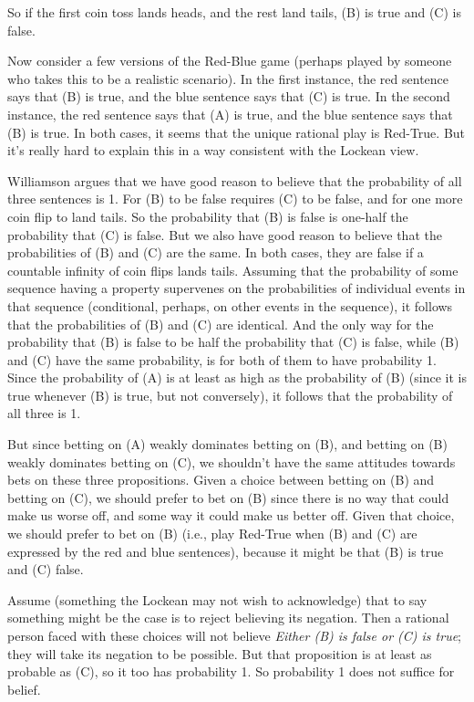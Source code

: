 \documentclass[11pt,]{book}
\begin{document}
So if the first coin toss lands heads, and the rest land tails, (B) is true and (C) is false.

Now consider a few versions of the Red-Blue game (perhaps played by someone who takes this to be a realistic scenario). In the first instance, the red sentence says that (B) is true, and the blue sentence says that (C) is true. In the second instance, the red sentence says that (A) is true, and the blue sentence says that (B) is true. In both cases, it seems that the unique rational play is Red-True. But it's really hard to explain this in a way consistent with the Lockean view.

Williamson argues that we have good reason to believe that the probability of all three sentences is 1. For (B) to be false requires (C) to be false, and for one more coin flip to land tails. So the probability that (B) is false is one-half the probability that (C) is false. But we also have good reason to believe that the probabilities of (B) and (C) are the same. In both cases, they are false if a countable infinity of coin flips lands tails. Assuming that the probability of some sequence having a property supervenes on the probabilities of individual events in that sequence (conditional, perhaps, on other events in the sequence), it follows that the probabilities of (B) and (C) are identical. And the only way for the probability that (B) is false to be half the probability that (C) is false, while (B) and (C) have the same probability, is for both of them to have probability 1. Since the probability of (A) is at least as high as the probability of (B) (since it is true whenever (B) is true, but not conversely), it follows that the probability of all three is 1.

But since betting on (A) weakly dominates betting on (B), and betting on (B) weakly dominates betting on (C), we shouldn't have the same attitudes towards bets on these three propositions. Given a choice between betting on (B) and betting on (C), we should prefer to bet on (B) since there is no way that could make us worse off, and some way it could make us better off. Given that choice, we should prefer to bet on (B) (i.e., play Red-True when (B) and (C) are expressed by the red and blue sentences), because it might be that (B) is true and (C) false.

Assume (something the Lockean may not wish to acknowledge) that to say something might be the case is to reject believing its negation. Then a rational person faced with these choices will not believe \emph{Either (B) is false or (C) is true}; they will take its negation to be possible. But that proposition is at least as probable as (C), so it too has probability 1. So probability 1 does not suffice for belief.
\end{document}
